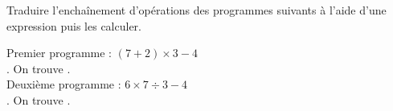 \begin{exercice}%
    Traduire l'enchaînement d'opérations des programmes suivants à l'aide d'une expression puis les calculer.
    \setlength{\columnseprule}{0pt}
    \begin{multicols}{2}
    \end{multicols}
    \vspace*{-5mm}
 \end{exercice}
 
 \begin{corrige}
    Premier programme : {\blue $(7 + 2)\times3-4$} \\ [1mm]
    . On trouve {}. \\
    Deuxième programme :  {\blue $6\times7\div3-4$} \\ [1mm]
    . On trouve {}.
 \end{corrige}